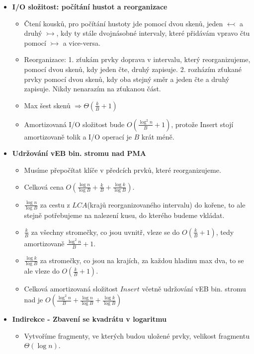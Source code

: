 \documentclass[11pt,a4paper]{article}
\begin{document}
\begin{itemize}
\begin{itemize}
    \end{itemize}
    \item \textbf{I/O složitost: počítání hustot a reorganizace}
    \begin{itemize}
        \item Čtení kousků, pro počítání hustoty jde pomocí dvou skenů, jeden $\leftarrowtail$ a druhý $\rightarrowtail$, kdy ty stále dvojnásobné intervaly, které přidávám vpravo čtu pomocí $\rightarrowtail$ a vice-versa.
        \item Reorganizace: 1. zťukám prvky doprava v intervalu, který reorganizujeme, pomocí dvou skenů, kdy jeden čte, druhý zapisuje. 2. rozházím zťukané prvky pomocí dvou skenů, kdy oba stejný směr a jeden čte a druhý zapisuje. Nikdy nenarazím na zťukanou část.
        \item Max šest skenů $\Rightarrow \Theta(\frac{k}{B} + 1)$
        \item Amortizovaná I/O složitost bude $O(\frac{\log^2 n}{B} +1)$, protože Insert stojí amortizovaně tolik a I/O operací je $B$ krát méně.
    \end{itemize}
    \item \textbf{Udržování vEB bin. stromu nad PMA}
    \begin{itemize}
        \item Musíme přepočítat klíče v předcích prvků, které reorganizujeme.
        \item Celková cena $O(\frac{\log n}{\log B} + \frac{k}{B} + \frac{\log k}{\log B})$.
        \item $\frac{\log n}{\log B}$ za cestu z $LCA$(krajů reorganizovaného intervalu) do kořene, to ale stejně potřebujeme na nalezení kusu, do kterého budeme vkládat.
        \item $\frac{k}{B}$ za všechny stromečky, co jsou uvnitř, vleze se do $O(\frac{k}B +1)$, tedy amortizovaně $\frac{\log^2 n}{B} + 1$.
        \item $\frac{\log k}{\log B}$ za stromečky, co jsou na krajích, za každou hladinu max dva, to se ale vleze do $O(\frac{k}{B} + 1)$.
        \item Celková amortizovaná složitost $Insert$ včetně udržování vEB bin. stromu nad je $O(\frac{\log^2 n}{B} + \frac{\log n}{\log B} + \frac{\log k}{\log B})$
    \end{itemize}
    \item \textbf{Indirekce - Zbavení se kvadrátu v logaritmu}
    \begin{itemize}
        \item Vytvoříme fragmenty, ve kterých budou uložené prvky, velikost fragmentu $\Theta(\log n)$.

\end{itemize}
\end{itemize}
\end{document}
